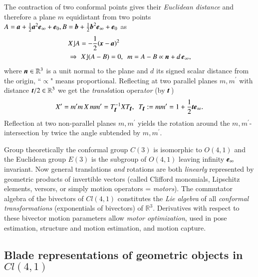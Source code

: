\documentclass[cameraready]{jcmsi}%
\newcommand{\R}{\mathbb{R}}
\newcommand{\gvec}[1]{\ensuremath{\mbox{\textbf{\textit{#1}}}}}
\begin{document}
The contraction of two conformal points gives their \textit{Euclidean distance} and 
therefore a plane $m$ equidistant from two points 
$A=\gvec{a} + \frac{1}{2}\gvec{a}^2\gvec{e}_{\infty}+\gvec{e}_0,
B=\gvec{b} + \frac{1}{2}\gvec{b}^2\gvec{e}_{\infty}+\gvec{e}_0$ as
\begin{align}
  &X\rfloor A = -\frac{1}{2}(\gvec{x}-\gvec{a})^2 
  \\
  &\Rightarrow \,\,X\rfloor (A-B)=0,
  \,\,\,
  m=A-B \propto \gvec{n}+d\,\gvec{e}_{\infty},
  \nonumber 
\end{align}
where $\gvec{n}\in\R^3$ is a unit normal to the plane and $d$ its signed scalar distance 
from the origin, ``$\propto$" means proportional. Reflecting at two parallel planes $m,m^{\prime}$ with 
distance $\gvec{t}/2\in\R^3$ we get the \textit{transla}tion opera\textit{tor} 
(by $\gvec{t}\,$)
\begin{equation}
  X^{\prime} = m^{\prime}m\,X\,mm^{\prime} = T_{\gvec{t}}^{-1} X T_{\gvec{t}},
  \,\,\, T_{\gvec{t}}:= mm^{\prime}=1+\frac{1}{2}\gvec{t}\gvec{e}_{\infty}.
  \label{eq:lintrans}
\end{equation}
Reflection at two non-parallel planes $m,m^{\prime}$ yields the rotation around
the $m,m^{\prime}$-intersection by twice the angle subtended by $m,m^{\prime}$.

Group theoretically the conformal group $C(3)$ \cite{GS:CMinGA} is isomorphic to $O(4,1)$ \cite{Wiki:IOG} and the
Euclidean group $E(3)$ is the subgroup of $O(4,1)$  leaving infinity 
$\gvec{e}_{\infty}$ invariant. 
Now general translations \textit{and} rotations are both \textit{linearly} represented by geometric products of invertible vectors (called Clifford monomials, Lipschitz elements, versors, or simply motion operators = \textit{motors}). The commutator algebra of the bivectors of $Cl(4,1)$ constitutes the \textit{Lie algebra} of all \textit{conformal transformations} (exponentials of bivectors) of $\R^3$. Derivatives with respect to these bivector motion parameters allow \textit{motor optimization}, used in pose estimation, structure and motion estimation, and motion capture.


\subsection{Blade representations of geometric objects in $Cl(4,1)$}
\end{document}

